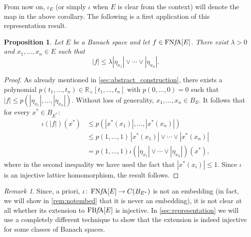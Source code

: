 \documentclass{memo-l}
\newtheorem{prop}[theorem]{Proposition}
\theoremstyle{definition}
\theoremstyle{remark}
\newtheorem{rem}[theorem]{Remark}
\numberwithin{section}{chapter}
\numberwithin{equation}{chapter}
\newcommand\R{\ensuremath{\mathbb{R}}}
\newcommand{\FNFA}[1]{\operatorname{FN{\it f}\!A}[#1]}
\newcommand{\FBFA}[1]{\operatorname{FB{\it f}\!A}[#1]}
\begin{document}
From now on, $\iota _E$ (or simply $\iota $ when $E$ is clear from
the context) will denote the map in the above corollary. The
following is a first application of this representation result.

\begin{prop}\label{prop:strong_unit}
    Let $E$ be a Banach space and let $f \in \FNFA E$. There exist $\lambda >0$ and $x_1,\ldots ,x_n
    \in E$ such that
    \[
    |f|\le \lambda |\eta _{x_1}|\vee \cdots \vee |\eta _{x_n}|.
    \]
\end{prop}
\begin{proof}
    As already mentioned in \cref{sec:abstract_construction}, there exists a polynomial $p(t_1,\ldots ,t_n)\in
    \R_+[t_1,\ldots ,t_n]$ with $p(0,\ldots ,0)=0$ such that $|f|\le p(|\eta  _{x_1}|,\ldots
    ,|\eta  _{x_n}|)$. Without loss of generality, $x_1,\ldots ,x_n \in B_E$. It follows
    that for every $x^{*} \in B_{E^{*}}$:
    \begin{align*}
        \iota (|f|)(x^{*})&\le p(|x^{*}(x_1)|,\ldots ,|x^{*}(x_n)|)\\&\le p(1,\ldots
    ,1)\, |x^{*}(x_1)|\vee \cdots \vee |x^{*}(x_n)|\\
                          &=p(1,\ldots ,1)\iota (|\eta _{x_1}|\vee
                          \cdots \vee |\eta _{x_n}|)(x^{*}),
    \end{align*}
    where in the second inequality we have used the fact that
    $|x^{*}(x_i)|\le 1$. Since $\iota $ is an injective lattice
    homomorphism, the result follows.
\end{proof}

\begin{rem}
    Since, a priori, $\iota \colon \FNFA E\to C(B_{E^{*}})$ is not an embedding
    (in fact, we will show in
    \cref{rem:notembed} that it is never an embedding), it is not
    clear at all whether its extension to
    $\FBFA E$ is injective. In \cref{sec:representation} we will
    use a completely different technique to show that the extension is indeed
    injective for some classes of Banach spaces.
\end{rem}
\end{document}
